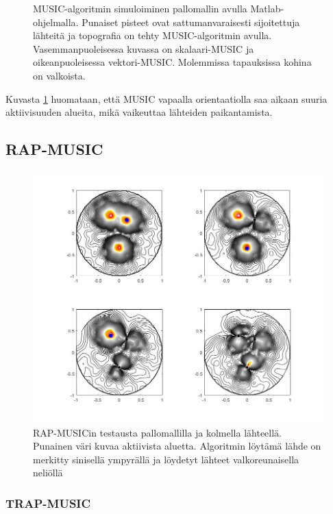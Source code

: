 \begin{figure}[h]
\begin{minipage}{0.45\textwidth}
    \end{minipage}
    \caption{MUSIC-algoritmin simuloiminen pallomallin avulla Matlab-ohjelmalla. Punaiset pisteet ovat sattumanvaraisesti sijoitettuja lähteitä ja topografia on tehty MUSIC-algoritmin avulla. Vasemmanpuoleisessa kuvassa on skalaari-MUSIC ja oikeanpuoleisessa vektori-MUSIC. Molemmissa tapauksissa kohina on valkoista.}
    \label{fig:MUSIC}
\end{figure}

Kuvasta \ref{fig:MUSIC} huomataan, että MUSIC vapaalla orientaatiolla saa aikaan suuria aktiivisuuden alueita, mikä vaikeuttaa lähteiden paikantamista.

\clearpage
\subsection{RAP-MUSIC}
\begin{figure}[h]
    \centering
    \includegraphics[width=1\textwidth]{rap11.jpg}
    \caption{RAP-MUSICin testausta pallomallilla ja kolmella lähteellä. Punainen väri kuvaa aktiivista aluetta. Algoritmin löytämä lähde on merkitty sinisellä ympyrällä ja löydetyt lähteet valkoreunaisella neliöllä}
    \label{fig:RAP}
\end{figure}

\subsubsection{TRAP-MUSIC}
